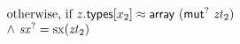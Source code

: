 $$\begin{array}[t]{@{}lrcl@{}l@{}}
{\begin{array}[t]{@{}l@{}l@{}l@{}}
 \multicolumn{3}{@{}l@{}}{\quad
\begin{array}[t]{@{}l@{}}
\quad
\begin{array}[t]{@{}l@{}}
\mbox{otherwise, if}~ z{.}\mathsf{types}{}[x_2] \approx \mathsf{array}~({\mathsf{mut}^?}~{\mathit{zt}}_2) \\
{\land}~ {{\mathit{sx}}^?} = {\mathrm{sx}}({\mathit{zt}}_2) \\
\end{array} \\
\end{array}
} \\
\end{array}
} \\
\end{array}
$$

\vspace{1ex}

